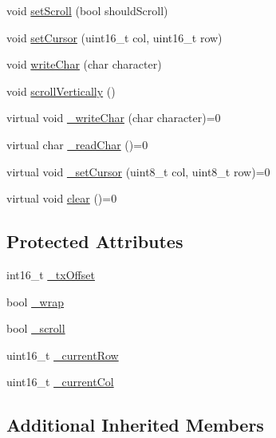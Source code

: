 \begin{DoxyCompactItemize}
\item 
void \hyperlink{classmhvlib_1_1_display___character_a1b57978621bb0d758a5f3973edae6caa}{set\-Scroll} (bool should\-Scroll)
\item 
void \hyperlink{classmhvlib_1_1_display___character_a609c8b86422a30af2f899eb803d78cda}{set\-Cursor} (uint16\-\_\-t col, uint16\-\_\-t row)
\item 
void \hyperlink{classmhvlib_1_1_display___character_ae959cef3979b65fbc06ddea6bd69629a}{write\-Char} (char character)
\item 
void \hyperlink{classmhvlib_1_1_display___character_aec9db04d4873961c2015a2c7c8f3e7b6}{scroll\-Vertically} ()
\item 
virtual void \hyperlink{classmhvlib_1_1_display___character_a762a42c313b6564989fd4430a6554089}{\-\_\-write\-Char} (char character)=0
\item 
virtual char \hyperlink{classmhvlib_1_1_display___character_a17761076940658303d3f91f1f842f09a}{\-\_\-read\-Char} ()=0
\item 
virtual void \hyperlink{classmhvlib_1_1_display___character_a8a27b478b9c392fddaac116d35224cd8}{\-\_\-set\-Cursor} (uint8\-\_\-t col, uint8\-\_\-t row)=0
\item 
virtual void \hyperlink{classmhvlib_1_1_display___character_ac8a0c7d5bf14760b6de2a79d4e253db4}{clear} ()=0
\end{DoxyCompactItemize}
\subsection*{Protected Attributes}
\begin{DoxyCompactItemize}
\item 
int16\-\_\-t \hyperlink{classmhvlib_1_1_display___character_adf8f97cb0d4d3c8972fae1b6193484ad}{\-\_\-tx\-Offset}
\item 
bool \hyperlink{classmhvlib_1_1_display___character_a15cfb25693d29606e1c7cd7d5aaf43dd}{\-\_\-wrap}
\item 
bool \hyperlink{classmhvlib_1_1_display___character_a7cca385d4236d082091311f9c295b167}{\-\_\-scroll}
\item 
uint16\-\_\-t \hyperlink{classmhvlib_1_1_display___character_a6e99a9d6f438c7f576f9b7fc57d1a386}{\-\_\-current\-Row}
\item 
uint16\-\_\-t \hyperlink{classmhvlib_1_1_display___character_a5a8ee5a95fde0a9cc463ffd9451cbc45}{\-\_\-current\-Col}
\end{DoxyCompactItemize}
\subsection*{Additional Inherited Members}


